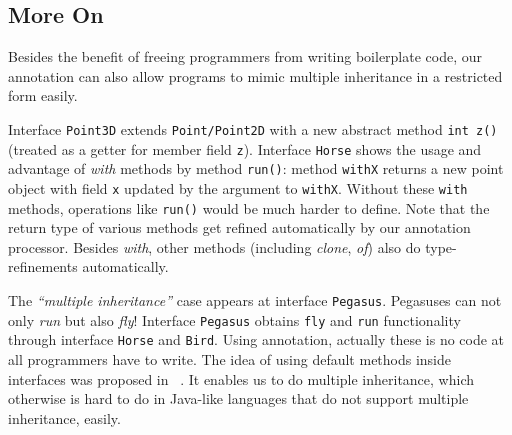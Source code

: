 \subsection{More On \mixin}
Besides the benefit of freeing programmers from writing boilerplate code, our
\mixin annotation can also allow programs to mimic multiple inheritance in a
restricted form easily.







Interface \texttt{Point3D} extends \texttt{Point/Point2D} with a new abstract
method \texttt{int z()} (treated as a getter for member field
\texttt{z}). Interface \texttt{Horse} shows the usage and advantage of
\emph{with} methods by method \texttt{run()}: method \texttt{withX} returns a
new point object with field \texttt{x} updated by the argument to
\texttt{withX}. Without these \texttt{with} methods, operations like
\texttt{run()} would be much harder to define. Note that the return type of
various methods get refined automatically by our annotation processor. Besides
\emph{with}, other methods (including \emph{clone}, \emph{of}) also do
type-refinements automatically.

The \emph{``multiple inheritance''} case appears at interface
\texttt{Pegasus}. Pegasuses can not only \emph{run} but also \emph{fly}!
Interface \texttt{Pegasus} obtains \texttt{fly} and \texttt{run} functionality
through interface \texttt{Horse} and \texttt{Bird}. Using \mixin annotation,
actually these is no code at all programmers have to write. The idea of using
default methods inside interfaces was proposed in ~\cite{}. It enables us to do
multiple inheritance, which otherwise is hard to do in Java-like languages that
do not support multiple inheritance, easily.

